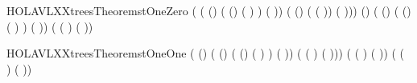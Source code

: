 \begin{SaveVerbatim}{HOLAVLXXtreesTheoremstOneZero}
\HOLTokenTurnstile{}  
     (   
        ( (\HOLSymConst{\ensuremath{-}})   ( (\HOLSymConst{\ensuremath{-}})   (     ) )
           (     ))
        ( (\HOLSymConst{\ensuremath{-}})   (     (     ))
           (     ))) \HOLSymConst{=}
    (\HOLSymConst{\ensuremath{-}})  
     ( (\HOLSymConst{\ensuremath{-}})   ( (\HOLSymConst{\ensuremath{-}})   (     ) )
        (     ))
     (    (     ) (     ))
\end{SaveVerbatim}
\newcommand{\HOLAVLXXtreesTheoremstOneZero}{\UseVerbatim{HOLAVLXXtreesTheoremstOneZero}}
\begin{SaveVerbatim}{HOLAVLXXtreesTheoremstOneOne}
\HOLTokenTurnstile{}  
     ( (\HOLSymConst{\ensuremath{-}})  
        ( (\HOLSymConst{\ensuremath{-}})   ( (\HOLSymConst{\ensuremath{-}})   (     ) )
           (     ))
        (    (     ) (     ))) \HOLSymConst{=}
       (    (     ) (     ))
     (    (     ) (     ))
\end{SaveVerbatim}

